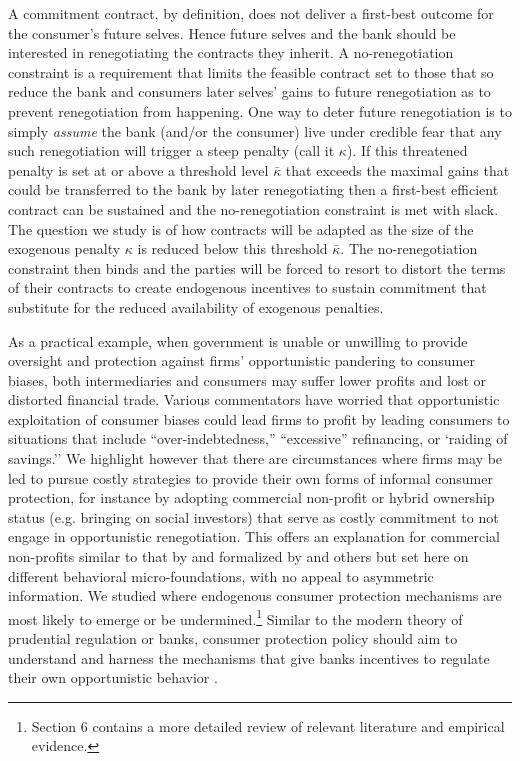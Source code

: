 \documentclass[11pt,english]{article}
\theoremstyle{plain}
\theoremstyle{definition}
\begin{document}
A commitment contract, by definition, does not deliver a first-best
outcome for the consumer's future selves. Hence future selves and the
bank should be interested in renegotiating the contracts they inherit. A no-renegotiation
constraint is a requirement that limits the feasible contract set to those that so reduce the bank and consumers later
selves' gains to future renegotiation as to prevent renegotiation from happening. One way
to deter future renegotiation is to simply \textit{assume}  the bank (and/or
the consumer) live under credible fear that any such renegotiation will trigger
a steep penalty (call it $\kappa$). If this threatened penalty is set
at or above a threshold level $\bar{\kappa}$ that exceeds the maximal
gains that could be transferred to the bank by later renegotiating
then a first-best efficient contract can be sustained and the no-renegotiation
constraint is met with slack. The question we study is of how contracts will be adapted as the size of
the exogenous penalty $\kappa$ is reduced below
this threshold $\bar{\kappa}$. The no-renegotiation
constraint then binds and the parties will be forced to resort to distort
the terms of their contracts to create endogenous incentives to sustain
commitment that substitute for the reduced availability of exogenous penalties.

As a practical example, when government is unable or unwilling to
provide oversight  and protection against  firms' opportunistic pandering to consumer biases,
both intermediaries and consumers may suffer lower profits and lost or distorted
financial trade. Various commentators have  worried that opportunistic exploitation of consumer biases  could lead firms to profit by leading consumers to situations that include    ``over-indebtedness,'' ``excessive'' refinancing, or `raiding of savings.'' We highlight however that there are circumstances where firms may be led to pursue costly strategies to provide their own forms
of informal consumer protection, for instance by adopting commercial non-profit or hybrid ownership status (e.g.
bringing on social investors)
that serve as costly commitment to not engage in opportunistic renegotiation. 
This offers an explanation
for commercial non-profits similar to that by \citet{hansmann1996a}
and formalized by \citet{glaeser2001} and others but set here on
different behavioral micro-foundations, with no appeal
to asymmetric information. We studied where endogenous consumer protection mechanisms are most likely to emerge or be undermined.\footnote{Section 6 contains a more detailed review of relevant literature and empirical evidence.} Similar to the modern theory of prudential regulation or banks, consumer protection policy should aim to understand and harness the mechanisms that give  banks incentives to regulate their own opportunistic behavior  \citep{dewatripont1999}.
\end{document}
